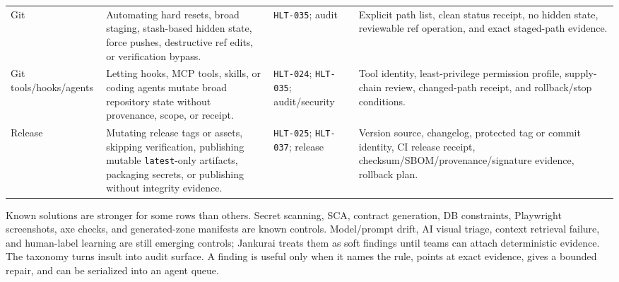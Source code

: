 \begin{table}[t]
\begin{tabularx}{\textwidth}{L{0.13\textwidth} Y L{0.18\textwidth} Y}
Git & Automating hard resets, broad staging, stash-based hidden state, force pushes, destructive ref edits, or verification bypass. & \texttt{HLT-035}; audit & Explicit path list, clean status receipt, no hidden state, reviewable ref operation, and exact staged-path evidence. \\
Git tools/hooks/agents & Letting hooks, MCP tools, skills, or coding agents mutate broad repository state without provenance, scope, or receipt. & \texttt{HLT-024}; \texttt{HLT-035}; audit/security & Tool identity, least-privilege permission profile, supply-chain review, changed-path receipt, and rollback/stop conditions. \\
Release & Mutating release tags or assets, skipping verification, publishing mutable \texttt{latest}-only artifacts, packaging secrets, or publishing without integrity evidence. & \texttt{HLT-025}; \texttt{HLT-037}; release & Version source, changelog, protected tag or commit identity, CI release receipt, checksum/SBOM/provenance/signature evidence, rollback plan. \\
\bottomrule
\end{tabularx}
\end{table}

\begin{center}
\end{center}

Known solutions are stronger for some rows than others. Secret scanning, SCA, contract generation, DB constraints, Playwright screenshots, axe checks, and generated-zone manifests are known controls. Model/prompt drift, AI visual triage, context retrieval failure, and human-label learning are still emerging controls; Jankurai treats them as soft findings until teams can attach deterministic evidence. The taxonomy turns insult into audit surface. A finding is useful only when it names the rule, points at exact evidence, gives a bounded repair, and can be serialized into an agent queue.
